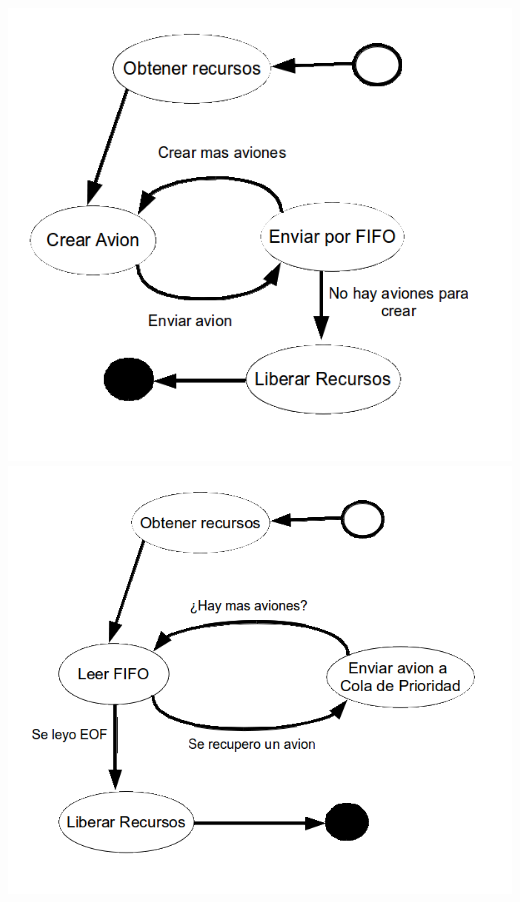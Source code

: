 \documentclass[a4paper,12pt,titlepage]{article}
\begin{document}
\includegraphics{./dia_est-generadorAviones}\\

\includegraphics{./dia_est-consumerAviones}\\
\end{document}
